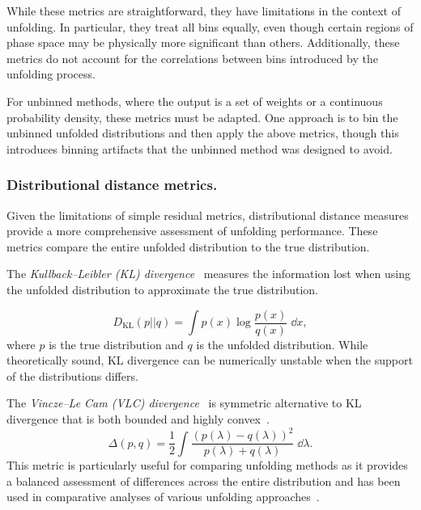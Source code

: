             While these metrics are straightforward, they have limitations in the context of unfolding.
            In particular, they treat all bins equally, even though certain regions of phase space may be physically more significant than others.
            Additionally, these metrics do not account for the correlations between bins introduced by the unfolding process.
            
            For unbinned methods, where the output is a set of weights or a continuous probability density, these metrics must be adapted.
            One approach is to bin the unbinned unfolded distributions and then apply the above metrics, though this introduces binning artifacts that the unbinned method was designed to avoid.

        \subsubsection{Distributional distance metrics.}
        \label{subsubsec:distributional-distance-metrics}
            Given the limitations of simple residual metrics, distributional distance measures provide a more comprehensive assessment of unfolding performance.
            These metrics compare the entire unfolded distribution to the true distribution.

            The \emph{Kullback--Leibler (KL) divergence}~\cite{kullback_information_1951} measures the information lost when using the unfolded distribution to approximate the true distribution.
            
            \begin{equation}
            D_{\text{KL}}(p||q) = \int p(x) \log \frac{p(x)}{q(x)} \;\dd x,
            \end{equation}
            where \(p\) is the true distribution and
            \(q\) is the unfolded distribution.
            While theoretically sound, KL divergence can be numerically unstable when the support of the distributions differs.
            
            The \emph{Vincze--Le Cam (VLC) divergence}~\cite{vincze_concept_1981,Cam1986AsymptoticTheory} is symmetric alternative to KL divergence that is both bounded and highly convex~\cite{melbourne_strongly_2020}.
            \begin{equation}
                \Delta(p, q) = \frac{1}{2}\int \frac{(p(\lambda) - q(\lambda))^2}{p(\lambda) + q(\lambda)} \;\dd\lambda.
            \end{equation}
            This metric is particularly useful for comparing unfolding methods as it provides a balanced assessment of differences across the entire distribution and has been used in comparative analyses of various unfolding approaches~\cite{andreassen_omnifold_2020, komiske_preserving_2021}.

